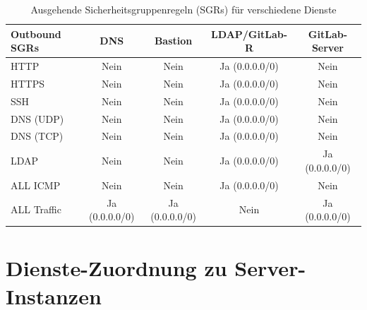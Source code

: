 \documentclass[a4paper,12pt]{article}
\begin{document}
\begin{table}[h!]
    \centering
    \begin{tabular}{|l|c|c|c|c|}
    \hline
    \textbf{Outbound SGRs} & \textbf{DNS}              & \textbf{Bastion}         & \textbf{LDAP/GitLab-R}    & \textbf{GitLab-Server}    \\ \hline
    HTTP                   & Nein                      & Nein                     & Ja (0.0.0.0/0)            & Nein                     \\ \hline
    HTTPS                  & Nein                      & Nein                     & Ja (0.0.0.0/0)            & Nein                     \\ \hline
    SSH                    & Nein                      & Nein                     & Ja (0.0.0.0/0)            & Nein                     \\ \hline
    DNS (UDP)              & Nein                      & Nein                     & Ja (0.0.0.0/0)            & Nein                     \\ \hline
    DNS (TCP)              & Nein                      & Nein                     & Ja (0.0.0.0/0)            & Nein                     \\ \hline
    LDAP                   & Nein                      & Nein                     & Ja (0.0.0.0/0)            & Ja (0.0.0.0/0)           \\ \hline
    ALL ICMP               & Nein                      & Nein                     & Ja (0.0.0.0/0)            & Nein                     \\ \hline
    ALL Traffic            & Ja (0.0.0.0/0)            & Ja (0.0.0.0/0)           & Nein                      & Ja (0.0.0.0/0)           \\ \hline
    \end{tabular}
    \caption{Ausgehende Sicherheitsgruppenregeln (SGRs) für verschiedene Dienste}
    \label{tab:outbound-sgrs}
\end{table}

\section{Dienste-Zuordnung zu Server-Instanzen}
\end{document}
